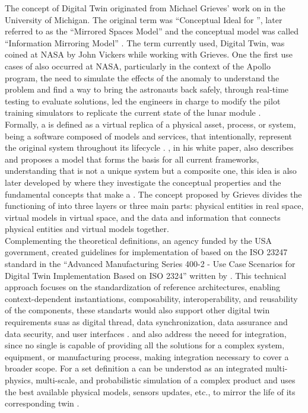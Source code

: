 The concept of Digital Twin originated from Michael Grieves' work on \PLM 
in the University of Michigan. The original term was ``Conceptual Ideal for \PLM'', later referred to as the
``Mirrored Spaces Model'' and the conceptual model was called ``Information Mirroring Model''  \cite{Grieves2017}.
The term currently used, Digital Twin, was coined at NASA by John Vickers while working with Grieves\cite{Wuni2025}.
One the first use cases of \DTs also occurred at NASA, particularly in the context of the Apollo program, the need to simulate the
effects of the anomaly to understand the problem and find a way to bring the astronauts back safely, through real-time testing to
evaluate solutions, led the engineers in charge to modify the pilot training simulators to replicate the current state of the
lunar module \cite{Allen2021}.\\
Formally, a \DT is defined as a virtual replica of a physical asset, process, or system, being a software composed of models and
services, that intentionally, represent the original system throughout its lifecycle \cite{Dalibor2022}.
, in his white paper, also describes and proposes a \DT model that forms the basis for all current frameworks,
understanding that \DT is not a unique system but a composite one, this idea is also later developed by  where they
investigate the conceptual properties and the fundamental concepts that make a \DT. The concept proposed by Grieves divides the
functioning of \DTs into three layers or three main parts: physical entities in real space, virtual models in virtual space, and the
data and information that connects physical entities and virtual models together.\\
Complementing the theoretical definitions, \NIST an agency funded by the
USA government, created guidelines for implementation of \DTs based on the ISO 23247 standard in the
``Advanced Manufacturing Series 400-2 - Use Case Scenarios for Digital Twin Implementation Based on ISO 2324'' written 
by . This technical approach focuses on the standardization of reference architectures, enabling 
context-dependent instantiations, composability, interoperability, and reusability of the \DTs components, 
these standarts would also support other digital twin requirements suas as digital thread, data synchronization, data assurance and
data security, and user interfaces \cite{Shao2021}.  and \NIST also address the neeed for integration,
since no single \DT is capable of providing all the solutions for a complex system, equipment, or manufacturing process,
making integration necessary to cover a broader scope. For a set definition a \DT can be understod as an integrated multi-physics,
multi-scale, and probabilistic simulation of a complex product and uses the best available physical models, sensors updates, etc.,
to mirror the life of its corresponding twin \cite{Tao2017PLM}.


